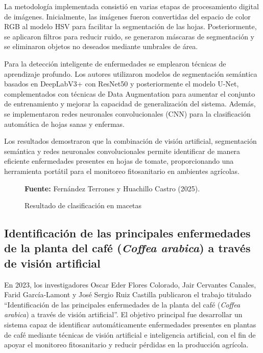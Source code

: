 La metodología implementada consistió en varias etapas de procesamiento digital de imágenes. Inicialmente, las imágenes fueron convertidas del espacio de color RGB al modelo HSV para facilitar la segmentación de las hojas. Posteriormente, se aplicaron filtros para reducir ruido, se generaron máscaras de segmentación y se eliminaron objetos no deseados mediante umbrales de área.

Para la detección inteligente de enfermedades se emplearon técnicas de aprendizaje profundo. Los autores utilizaron modelos de segmentación semántica basados en DeepLabV3+ con ResNet50 y posteriormente el modelo U-Net, complementados con técnicas de Data Augmentation para aumentar el conjunto de entrenamiento y mejorar la capacidad de generalización del sistema. Además, se implementaron redes neuronales convolucionales (CNN) para la clasificación automática de hojas sanas y enfermas.

Los resultados demostraron que la combinación de visión artificial, segmentación semántica y redes neuronales convolucionales permite identificar de manera eficiente enfermedades presentes en hojas de tomate, proporcionando una herramienta portátil para el monitoreo fitosanitario en ambientes agrícolas.

\begin{figure}[H]
    \centering
    \caption{Resultado de clasificación en macetas}
    \label{fig:1_1_8}
    \vspace{0.2cm}
    \footnotesize \textbf{Fuente:} Fernández Terrones y Huachillo Castro (2025).
\end{figure}


\subsection{Identificación de las principales enfermedades de la planta del café (\textit{Coffea arabica}) a través de visión artificial}

En 2023, los investigadores Oscar Eder Flores Colorado, Jair Cervantes Canales, Farid García-Lamont y José Sergio Ruiz Castilla publicaron el trabajo titulado ``Identificación de las principales enfermedades de la planta del café (\textit{Coffea arabica}) a través de visión artificial''. El objetivo principal fue desarrollar un sistema capaz de identificar automáticamente enfermedades presentes en plantas de café mediante técnicas de visión artificial e inteligencia artificial, con el fin de apoyar el monitoreo fitosanitario y reducir pérdidas en la producción agrícola.

